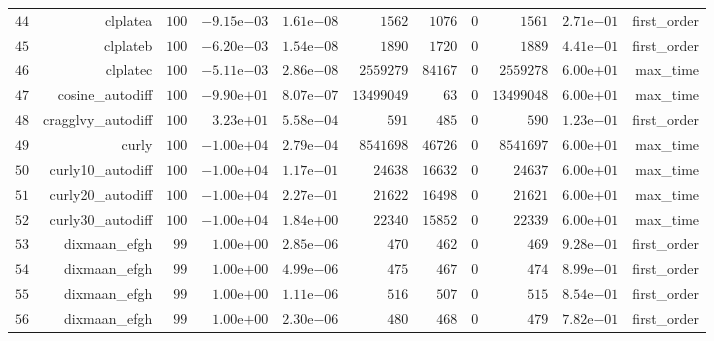 \documentclass[varwidth=20cm,crop=true]{standalone}
\begin{document}
\begin{longtable}{rrrrrrrrrrr}
  \(    44\) & clplatea & \(   100\) & \(-9.15\)e\(-03\) & \( 1.61\)e\(-08\) & \(  1562\) & \(  1076\) & \(     0\) & \(  1561\) & \( 2.71\)e\(-01\) & first\_order \\
  \(    45\) & clplateb & \(   100\) & \(-6.20\)e\(-03\) & \( 1.54\)e\(-08\) & \(  1890\) & \(  1720\) & \(     0\) & \(  1889\) & \( 4.41\)e\(-01\) & first\_order \\
  \(    46\) & clplatec & \(   100\) & \(-5.11\)e\(-03\) & \( 2.86\)e\(-08\) & \(2559279\) & \( 84167\) & \(     0\) & \(2559278\) & \( 6.00\)e\(+01\) & max\_time \\
  \(    47\) & cosine\_autodiff & \(   100\) & \(-9.90\)e\(+01\) & \( 8.07\)e\(-07\) & \(13499049\) & \(    63\) & \(     0\) & \(13499048\) & \( 6.00\)e\(+01\) & max\_time \\
  \(    48\) & cragglvy\_autodiff & \(   100\) & \( 3.23\)e\(+01\) & \( 5.58\)e\(-04\) & \(   591\) & \(   485\) & \(     0\) & \(   590\) & \( 1.23\)e\(-01\) & first\_order \\
  \(    49\) & curly & \(   100\) & \(-1.00\)e\(+04\) & \( 2.79\)e\(-04\) & \(8541698\) & \( 46726\) & \(     0\) & \(8541697\) & \( 6.00\)e\(+01\) & max\_time \\
  \(    50\) & curly10\_autodiff & \(   100\) & \(-1.00\)e\(+04\) & \( 1.17\)e\(-01\) & \( 24638\) & \( 16632\) & \(     0\) & \( 24637\) & \( 6.00\)e\(+01\) & max\_time \\
  \(    51\) & curly20\_autodiff & \(   100\) & \(-1.00\)e\(+04\) & \( 2.27\)e\(-01\) & \( 21622\) & \( 16498\) & \(     0\) & \( 21621\) & \( 6.00\)e\(+01\) & max\_time \\
  \(    52\) & curly30\_autodiff & \(   100\) & \(-1.00\)e\(+04\) & \( 1.84\)e\(+00\) & \( 22340\) & \( 15852\) & \(     0\) & \( 22339\) & \( 6.00\)e\(+01\) & max\_time \\
  \(    53\) & dixmaan\_efgh & \(    99\) & \( 1.00\)e\(+00\) & \( 2.85\)e\(-06\) & \(   470\) & \(   462\) & \(     0\) & \(   469\) & \( 9.28\)e\(-01\) & first\_order \\
  \(    54\) & dixmaan\_efgh & \(    99\) & \( 1.00\)e\(+00\) & \( 4.99\)e\(-06\) & \(   475\) & \(   467\) & \(     0\) & \(   474\) & \( 8.99\)e\(-01\) & first\_order \\
  \(    55\) & dixmaan\_efgh & \(    99\) & \( 1.00\)e\(+00\) & \( 1.11\)e\(-06\) & \(   516\) & \(   507\) & \(     0\) & \(   515\) & \( 8.54\)e\(-01\) & first\_order \\
  \(    56\) & dixmaan\_efgh & \(    99\) & \( 1.00\)e\(+00\) & \( 2.30\)e\(-06\) & \(   480\) & \(   468\) & \(     0\) & \(   479\) & \( 7.82\)e\(-01\) & first\_order \\

\end{longtable}
\end{document}
